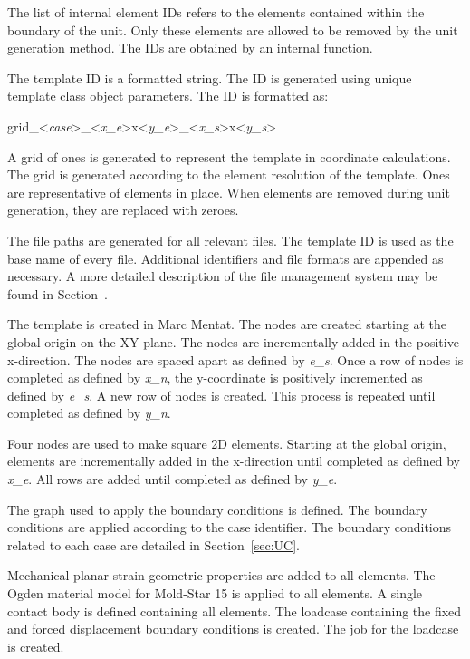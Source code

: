 The list of internal element IDs refers to the elements contained within the boundary of the unit. Only these elements are allowed to be removed by the unit generation method. The IDs are obtained by an internal function.

The template ID is a formatted string. The ID is generated using unique template class object parameters. The ID is formatted as:

\vspace{\baselineskip}

\centerline{grid\_<\textit{case}>\_<\textit{x\_e}>x<\textit{y\_e}>\_<\textit{x\_s}>x<\textit{y\_s}>}

\vspace{\baselineskip}

A grid of ones is generated to represent the template in coordinate calculations. The grid is generated according to the element resolution of the template. Ones are representative of elements in place. When elements are removed during unit generation, they are replaced with zeroes.

The file paths are generated for all relevant files. The template ID is used as the base name of every file. Additional identifiers and file formats are appended as necessary. A more detailed description of the file management system may be found in Section~.

The template is created in Marc Mentat. The nodes are created starting at the global origin on the XY-plane. The nodes are incrementally added in the positive x-direction. The nodes are spaced apart as defined by \textit{e\_s}. Once a row of nodes is completed as defined by \textit{x\_n}, the y-coordinate is positively incremented as defined by \textit{e\_s}. A new row of nodes is created. This process is repeated until completed as defined by \textit{y\_n}.

Four nodes are used to make square 2D elements. Starting at the global origin, elements are incrementally added in the x-direction until completed as defined by \textit{x\_e}. All rows are added until completed as defined by \textit{y\_e}.

The graph used to apply the boundary conditions is defined. The boundary conditions are applied according to the case identifier. The boundary conditions related to each case are detailed in Section~\ref{sec:UC}.

Mechanical planar strain geometric properties are added to all elements. The Ogden material model for Mold-Star 15 is applied to all elements. A single contact body is defined containing all elements. The loadcase containing the fixed and forced displacement boundary conditions is created. The job for the loadcase is created.

